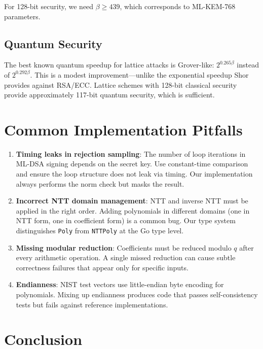 \documentclass[11pt,a4paper]{article}
\begin{document}
For 128-bit security, we need $\beta \geq 439$, which corresponds to ML-KEM-768 parameters.

\subsection{Quantum Security}

The best known quantum speedup for lattice attacks is Grover-like: $2^{0.265\beta}$
instead of $2^{0.292\beta}$. This is a modest improvement---unlike the exponential
speedup Shor provides against RSA/ECC. Lattice schemes with 128-bit classical security
provide approximately 117-bit quantum security, which is sufficient.

\section{Common Implementation Pitfalls}

\begin{enumerate}
  \item \textbf{Timing leaks in rejection sampling}: The number of loop iterations in
    ML-DSA signing depends on the secret key. Use constant-time comparison and ensure
    the loop structure does not leak via timing. Our implementation always performs the
    norm check but masks the result.

  \item \textbf{Incorrect NTT domain management}: NTT and inverse NTT must be applied in
    the right order. Adding polynomials in different domains (one in NTT form, one in
    coefficient form) is a common bug. Our type system distinguishes \texttt{Poly} from
    \texttt{NTTPoly} at the Go type level.

  \item \textbf{Missing modular reduction}: Coefficients must be reduced modulo $q$ after
    every arithmetic operation. A single missed reduction can cause subtle correctness
    failures that appear only for specific inputs.

  \item \textbf{Endianness}: NIST test vectors use little-endian byte encoding for
    polynomials. Mixing up endianness produces code that passes self-consistency tests
    but fails against reference implementations.
\end{enumerate}

\section{Conclusion}
\end{document}
